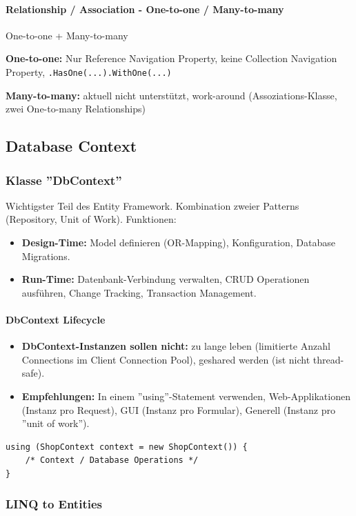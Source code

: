 \documentclass[
a4paper,
oneside,
10pt,
fleqn,
headsepline,
toc=listofnumbered, 
bibliography=totocnumbered]{scrartcl}
\begin{document}
\paragraph{Relationship / Association - One-to-one / Many-to-many} One-to-one + Many-to-many

\textbf{One-to-one:} Nur Reference Navigation Property, keine Collection Navigation Property, \lstinline|.HasOne(...).WithOne(...)|

\textbf{Many-to-many:} aktuell nicht unterstützt, work-around (Assoziations-Klasse, zwei One-to-many Relationships)

\subsection{Database Context}
\subsubsection{Klasse ''DbContext''}
Wichtigster Teil des Entity Framework. Kombination zweier Patterns (Repository, Unit of Work). Funktionen:
\begin{itemize}
	\item \textbf{Design-Time:} Model definieren (OR-Mapping), Konfiguration, Database Migrations.
	\item \textbf{Run-Time:} Datenbank-Verbindung verwalten, CRUD Operationen ausführen, Change Tracking, Transaction Management.
\end{itemize}

\paragraph{DbContext Lifecycle}
\begin{itemize}
	\item \textbf{DbContext-Instanzen sollen nicht:} zu lange leben (limitierte Anzahl Connections im Client Connection Pool), geshared werden (ist nicht thread-safe).
	\item \textbf{Empfehlungen:} In einem ''using''-Statement verwenden, Web-Applikationen (Instanz pro Request), GUI (Instanz pro Formular), Generell (Instanz pro ''unit of work'').
\end{itemize}

\begin{lstlisting}
using (ShopContext context = new ShopContext()) {
    /* Context / Database Operations */
}
\end{lstlisting}

\subsubsection{LINQ to Entities}
\end{document}
